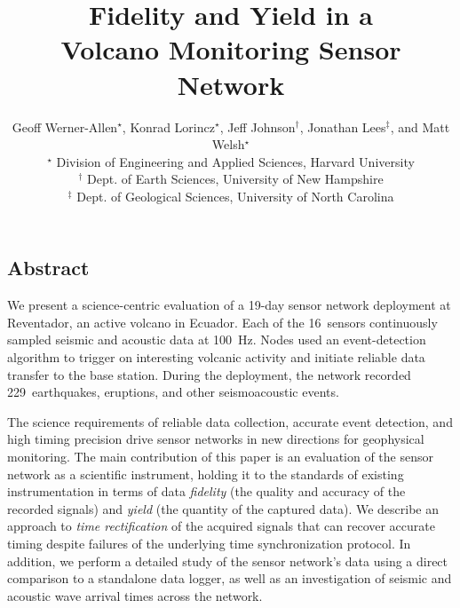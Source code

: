 \documentclass[10pt]{article}
\begin{document}

\date{}


\title{{\ttlfnt Fidelity and Yield in a \\ Volcano Monitoring Sensor
Network}}
\author{{\aufnt Geoff Werner-Allen$^\star$, Konrad Lorincz$^\star$, 
Jeff Johnson$^\dag$, Jonathan Lees$^\ddag$, and Matt Welsh$^\star$} \\
{\affaddr $^\star$ Division of Engineering and Applied Sciences, Harvard University} \\
{\affaddr $^\dag$ Dept. of Earth Sciences, University of New Hampshire} \\
{\affaddr $^\ddag$ Dept. of Geological Sciences, University of North
Carolina}}
\maketitle

\thispagestyle{empty}


\subsection*{Abstract}
\begin{small}
We present a science-centric evaluation of a 19-day sensor
network deployment at Reventador, an active volcano in Ecuador.
Each of the 16~sensors continuously sampled seismic and acoustic 
data at 100~Hz. Nodes used an event-detection algorithm to trigger 
on interesting volcanic activity and initiate reliable data transfer 
to the base station. During the deployment, the network recorded
229~earthquakes, eruptions, and other seismoacoustic events. 
\end{small}

\begin{small}
The science requirements of reliable data
collection, accurate event detection, and high timing precision 
drive sensor networks in new directions for geophysical monitoring.
The main contribution of this paper is an evaluation of the sensor
network as a scientific instrument, holding it to the standards
of existing instrumentation in terms of data {\em fidelity} (the
quality and accuracy of the recorded signals) and {\em yield} (the quantity
of the captured data).  
We describe an approach to {\em time rectification} of the acquired 
signals that can recover accurate timing despite failures of the 
underlying time synchronization protocol. In addition, we perform a 
detailed study of the sensor network's data using a direct comparison 
to a standalone data logger, as well as an investigation of seismic 
and acoustic wave arrival times across the network. 
\end{small}
\end{document}

